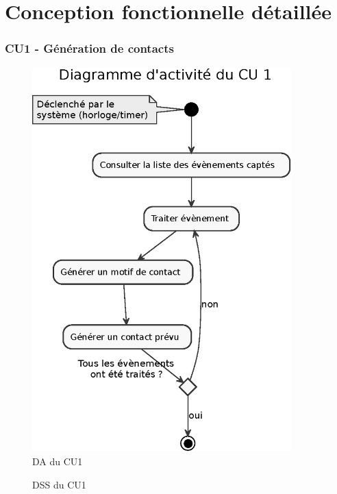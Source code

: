 \part{Conception fonctionnelle détaillée}
\setcounter{section}{0}

\section{CU1 - Génération de contacts}
\begin{figure}[H]
\centering
\includegraphics[width=10cm]{figures/eps/DA_CU1.eps}
\caption{DA du CU1}
\end{figure}
\vspace{2cm}
\begin{figure}[H]
\noindent{}
\caption{DSS du CU1}
\end{figure}


